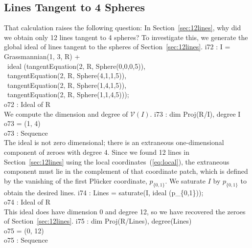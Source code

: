 \subsection{Lines Tangent to 4 Spheres}\label{sec:tangent_lines}
That calculation raises the following question:
In Section~\ref{sec:12lines}, why did we obtain only 12 lines tangent to 4
spheres? 
To investigate this, we generate the global ideal of lines tangent to the 
spheres of Section~\ref{sec:12lines}.
%
\beginOutput
i72 : I = Grassmannian(1, 3, R) + \\
\              ideal (tangentEquation(2, R, Sphere(0,0,0,5)),\\
\                     tangentEquation(2, R, Sphere(4,1,1,5)),\\
\                     tangentEquation(2, R, Sphere(1,4,1,5)),\\
\                     tangentEquation(2, R, Sphere(1,1,4,5)));\\
\emptyLine
o72 : Ideal of R\\
\endOutput
%
We compute the dimension and degree of ${\mathcal V}(I)$.
%
\beginOutput
i73 : dim Proj(R/I), degree I\\
\emptyLine
o73 = (1, 4)\\
\emptyLine
o73 : Sequence\\
\endOutput
%
The ideal is not zero dimensional; there is an
extraneous one-dimensional 
component of zeroes with degree 4.
Since we found 12 lines in
Section~\ref{sec:12lines} using the local coordinates~(\ref{eq:local}),
the extraneous component must lie in the complement of that coordinate patch,
which is defined by the vanishing of the first Pl\"ucker coordinate, $p_{\{0,1\}}$.
We saturate $I$ by $p_{\{0,1\}}$ to obtain the desired lines.
%
\beginOutput
i74 : Lines = saturate(I, ideal (p_\{0,1\}));\\
\emptyLine
o74 : Ideal of R\\
\endOutput
%
This ideal does have dimension 0 and degree 12, so we have recovered the
zeroes of Section~\ref{sec:12lines}.
%
\beginOutput
i75 : dim Proj(R/Lines), degree(Lines)\\
\emptyLine
o75 = (0, 12)\\
\emptyLine
o75 : Sequence\\
\endOutput
%

